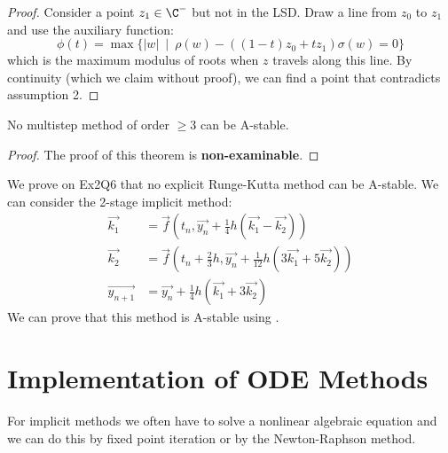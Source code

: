 \documentclass[../Main.tex]{subfiles}
\begin{document}
\begin{proof}
    Consider a point $z_1 \in \C^-$ but not in the LSD. Draw a line from $z_0$ to $z_1$ and use the auxiliary function:
    \begin{equation*}
        \phi(t) = \max\{|w|~\mid~\rho(w) - ((1-t)z_0 + tz_1)\sigma(w) = 0 \}
    \end{equation*}
    which is the maximum modulus of roots when $z$ travels along this line. By continuity (which we claim without proof), we can find a point that contradicts assumption 2.
\end{proof}
\begin{theorem}
    No multistep method of order $\geq 3$ can be A-stable.
    \label{thmDahlquistBarrier}
\end{theorem}
\begin{proof}
    The proof of this theorem is \textbf{non-examinable}.
\end{proof}
We prove on Ex2Q6 that no explicit Runge-Kutta method can be A-stable. We can consider the 2-stage implicit method:
\begin{align*}
    \vec{k_1} &= \vec{f}\left(t_n, \vec{y_{n}} + \frac14 h (\vec{k_{1}} - \vec{k_{2}})\right) \\
    \vec{k_2} &= \vec{f}\left(t_n + \frac23h, \vec{y_{n}} + \frac{1}{12} h (3\vec{k_{1}} + 5\vec{k_{2}})\right) \\
    \vec{y_{n+1}} &= \vec{y_{n}} + \frac14 h (\vec{k_1} + 3\vec{k_2})
\end{align*}
We can prove that this method is A-stable using .
\section{Implementation of ODE Methods}
For implicit methods we often have to solve a nonlinear algebraic equation and we can do this by fixed point iteration or by the Newton-Raphson method.
\end{document}
